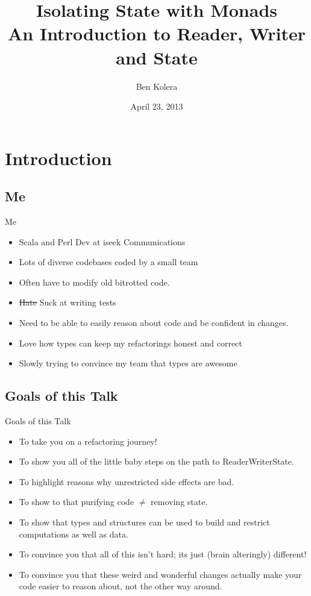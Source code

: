 \documentclass[professionalFonts,aspectratio=169]{beamer}
\title[Isolating State with Monads]{%
  Isolating State with Monads\\An Introduction to Reader, Writer and State
}
\author{Ben Kolera}
\institute{bfpg.org}
\date{April 23, 2013}
\begin{document}
\begin{frame}
\titlepage
\end{frame}

\section{Introduction}

\subsection{Me}
\begin{frame}{Me}

\begin{itemize}
\pause \item Scala and Perl Dev at iseek Communications
\pause \item Lots of diverse codebases coded by a small team
\pause \item Often have to modify old bitrotted code.
\pause \item \sout{Hate} Suck at writing tests
\pause \item Need to be able to easily reason about code and be confident in changes.
\pause \item Love how types can keep my refactorings honest and correct
\pause \item Slowly trying to convince my team that types are awesome
\end{itemize}
\end{frame}

\subsection{Goals of this Talk}
\begin{frame}{Goals of this Talk}

\begin{itemize}
  \pause \item To take you on a refactoring journey!
  \pause \item To show you all of the little baby steps on the path to ReaderWriterState.
  \pause \item To highlight reasons why unrestricted side effects are bad.
  \pause \item To show to that purifying code $\neq$ removing state.
  \pause \item To show that types and structures can be used to build and restrict computations as well as data.
  \pause \item To convince you that all of this isn't hard; its just (brain alteringly) different!
  \pause \item To convince you that these weird and wonderful changes actually make your code easier to reason about, not the other way around.
\end{itemize}

\end{frame}
\end{document}
